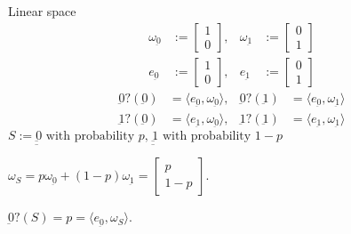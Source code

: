 \documentclass{beamer}
\begin{document}
\begin{frame}{Linear space}
\begin{align*}
\omega_{\underbar{0}} &:= \begin{bmatrix}1\\0\end{bmatrix},&
\omega_{\underbar{1}} &:= \begin{bmatrix}0\\1\end{bmatrix}\\
e_{\underbar{0}} &:= \begin{bmatrix}1\\0\end{bmatrix},&
e_{\underbar{1}} &:= \begin{bmatrix}0\\1\end{bmatrix}
\end{align*}
\begin{align*}
{\underbar{0}}?({\underbar{0}}) &= \langle e_{\underbar{0}}, \omega_{\underbar{0}}\rangle,&
{\underbar{0}}?({\underbar{1}}) &= \langle e_{\underbar{0}}, \omega_{\underbar{1}}\rangle\\
{\underbar{1}}?({\underbar{0}}) &= \langle e_{\underbar{1}}, \omega_{\underbar{0}}\rangle,&
{\underbar{1}}?({\underbar{1}}) &= \langle e_{\underbar{1}}, \omega_{\underbar{1}}\rangle
\end{align*}
$S := \text{$\underbar{{\underbar{0}}}$ with probability $p$, $\underbar{{\underbar{1}}}$ with probability $1-p$}$

$\omega_S = p \omega_{\underbar{0}} + (1-p) \omega_{\underbar{1}}=\begin{bmatrix}p\\1-p\end{bmatrix}$.

\vspace{1em}
${\underbar{0}?}(S) = p= \langle e_{\underbar{0}}, \omega_S\rangle$.

\end{frame}
\end{document}
